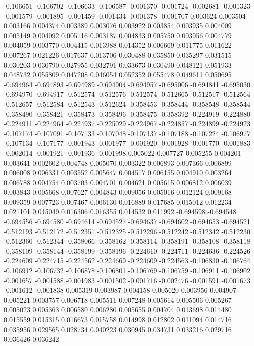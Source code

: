 -0.106651
-0.106702
-0.106633
-0.106587
-0.001370
-0.001724
-0.002681
-0.001323
-0.001579
-0.001895
-0.001459
-0.001434
-0.001378
-0.001707
0.003624
0.003504
0.003166
0.004374
0.003389
0.003076
0.003922
0.003854
0.003935
0.004009
0.005149
0.004092
0.005116
0.003187
0.004833
0.005750
0.003956
0.004779
0.004059
0.003770
0.004415
0.013988
0.014352
0.006669
0.011775
0.011622
0.007267
0.021226
0.017637
0.013706
0.030488
0.035850
0.035297
0.031515
0.030203
0.030790
0.027955
0.032791
0.033673
0.030490
0.048121
0.051933
0.048732
0.055809
0.047208
0.046054
0.052352
0.055478
0.049611
0.050695
-0.694964
-0.694893
-0.694989
-0.694904
-0.694957
-0.695006
-0.694841
-0.695030
-0.694970
-0.694917
-0.512574
-0.512576
-0.512574
-0.512665
-0.512517
-0.512564
-0.512657
-0.512584
-0.512543
-0.512624
-0.358453
-0.358444
-0.358548
-0.358544
-0.358490
-0.358421
-0.358473
-0.358496
-0.358475
-0.358392
-0.224919
-0.224880
-0.224911
-0.224964
-0.224937
-0.225029
-0.224967
-0.224857
-0.224899
-0.224923
-0.107174
-0.107091
-0.107133
-0.107048
-0.107137
-0.107188
-0.107224
-0.106977
-0.107134
-0.107177
-0.001943
-0.001977
-0.001920
-0.001928
-0.001770
-0.001883
-0.002014
-0.001921
-0.001936
-0.001998
0.005022
0.007727
0.005255
0.004201
0.003641
0.002602
0.004748
0.005070
0.003322
0.006893
0.007366
0.006899
0.006008
0.006331
0.003552
0.005647
0.004517
0.006155
0.004910
0.003264
0.006788
0.004754
0.003703
0.004701
0.004621
0.005615
0.006812
0.006039
0.003843
0.005668
0.007627
0.004843
0.009056
0.005016
0.012124
0.009168
0.009359
0.007723
0.007467
0.006130
0.016889
0.017685
0.015012
0.012234
0.021101
0.015049
0.016306
0.016355
0.014532
0.011992
-0.694598
-0.694548
-0.694556
-0.694580
-0.694614
-0.694527
-0.694637
-0.694602
-0.694653
-0.694521
-0.512193
-0.512172
-0.512351
-0.512325
-0.512296
-0.512242
-0.512342
-0.512230
-0.512360
-0.512344
-0.358066
-0.358162
-0.358114
-0.358191
-0.358108
-0.358118
-0.358109
-0.358144
-0.358199
-0.358196
-0.224610
-0.224711
-0.224636
-0.224526
-0.224609
-0.224715
-0.224562
-0.224669
-0.224609
-0.224563
-0.106830
-0.106764
-0.106912
-0.106732
-0.106878
-0.106801
-0.106769
-0.106759
-0.106911
-0.106902
-0.001657
-0.001588
-0.001983
-0.001502
-0.001716
-0.002476
-0.001591
-0.001673
-0.001612
-0.001838
0.005319
0.003987
0.004158
0.005620
0.003956
0.004907
0.005221
0.003757
0.006718
0.005511
0.007248
0.005614
0.005506
0.005267
0.005023
0.005363
0.006580
0.006280
0.005655
0.004704
0.013698
0.014480
0.015559
0.015315
0.016673
0.015758
0.014998
0.012802
0.011094
0.014716
0.035956
0.029565
0.028734
0.040223
0.030945
0.034731
0.033216
0.029716
0.036426
0.036242
